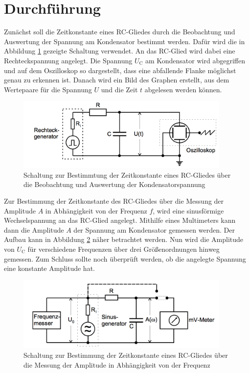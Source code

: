 \section{Durchführung}
\label{sec:Durchführung}
Zunächst soll die Zeitkonstante eines RC-Gliedes durch die Beobachtung und Auswertung
der Spannung am Kondensator bestimmt werden. Dafür wird die in Abbildung \ref{fig:Schaltung_4a}
gezeigte Schaltung verwendet. An das RC-Glied wird dabei eine
Rechteckspannung angelegt. Die Spannung $U_{\text{C}}$ am Kondensator wird abgegriffen und auf dem
Oszilloskop so dargestellt, dass eine abfallende Flanke möglichst genau zu erkennen ist.
Danach wird ein Bild des Graphen erstellt, aus dem Wertepaare für die Spannung $U$
und die Zeit $t$ abgelesen werden können.

\begin{figure}
  \centering
  \includegraphics[width=300pt]{data/4a_schaltung.png}
  \caption{Schaltung zur Bestimmtung der Zeitkonstante eines RC-Gliedes über die Beobachtung
  und Auswertung der Kondensatorspannung \cite{Versuchsanleitung}}
  \label{fig:Schaltung_4a}
\end{figure}

Zur Bestimmung der Zeitkonstante des RC-Gliedes über die Messung der Amplitude $A$ in
Abhängigkeit von der Frequenz $f$, wird eine sinusförmige
Wechselspannung an das RC-Glied angelegt. Mithilfe eines Multimeters kann dann die Amplitude
$A$ der Spannung am Kondensator gemessen werden. Der Aufbau kann in Abbildung \ref{fig:Schaltung_4b}
näher betrachtet werden. Nun wird die Amplitude von $U_{\text{C}}$ für
verschiedene Frequenzen über drei Größenordnungen hinweg gemessen. Zum Schluss sollte
noch überprüft werden, ob die angelegte Spannung eine konstante Amplitude hat.

\begin{figure}
  \centering
  \includegraphics[width=300pt]{data/4b_schaltung.png}
  \caption{Schaltung zur Bestimmung der Zeitkonstante eines RC-Gliedes über die Messung
  der Amplitude in Abhängigkeit von der Frequenz \cite{Versuchsanleitung}}
  \label{fig:Schaltung_4b}
\end{figure}

